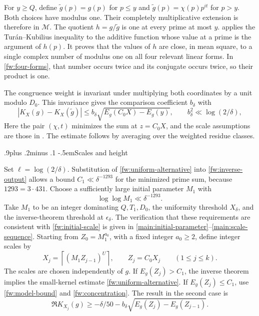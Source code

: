 \documentclass[twoside]{aomart}
\makeatletter
\theoremstyle{paperplain}
\theoremstyle{paperdefinition}
\renewcommand\subsection{\@startsection{subsection}{2}{\z@}
  {.9\baselineskip plus .2\baselineskip minus .1\baselineskip}
  {-.5em}{\normalfont\bfseries}}
\numberwithin{equation}{section}
\makeatother
\begin{document}
For $y\ge Q$, define $\widetilde g(p)=g(p)$ for $p\le y$ and
$\widetilde g(p)=\chi(p)p^{it}$ for $p>y$. Both choices have modulus
one. Their completely multiplicative extension is therefore in
$\mathcal M$. The quotient $h=g/\widetilde g$ is one at every
prime at most $y$.
 applies the Tur\'an--Kubilius inequality to
the additive function whose value at a prime is the argument of
$h(p)$. It proves that the values of $h$ are close, in mean square,
to a single complex number of modulus one on all four relevant
linear forms. In \eqref{fw:four-forms}, that number occurs twice
and its conjugate occurs twice, so their product is one.

The congruence weight is invariant under multiplying both
coordinates by a unit modulo $D_0$. This invariance gives the
comparison coefficient $b_\delta$ with
\begin{equation}
 |K_X(g)-K_X(\widetilde g)|
 \le b_\delta\sqrt{E_g(C_0X)-E_g(y)},
 \qquad b_\delta^2\ll\log(2/\delta),
 \label{fw:concentration}
\end{equation}
Here the pair $(\chi,t)$ minimizes the sum at $z=C_0X$,
and the scale assumptions are those in .
The estimate follows by averaging over the weighted residue classes.

\subsection{Scales and height}

Set $\ell=\log(2/\delta)$. Substitution of
\eqref{fw:uniform-alternative} into \eqref{fw:inverse-output}
allows a bound $C_1\ll\delta^{-1293}$ for the minimized prime sum,
because $1293=3\cdot431$. Choose a sufficiently large initial
parameter $M_1$ with
\begin{equation}
 \log\log M_1\ll\delta^{-1293}.
\label{fw:initial-scale}
\end{equation}
Take $M_1$ to be an integer dominating $Q,T_1,D_0$, the uniformity
threshold $X_\delta$, and the inverse-theorem threshold at
$\epsilon_\delta$. The verification that these requirements are
consistent with \eqref{fw:initial-scale} is given in
\eqref{main:initial-parameter}--\eqref{main:scale-sequence}.
Starting from $Z_0=M_1^{a_0}$, with a fixed integer $a_0\ge2$,
define integer scales by
\begin{equation}
 X_j=\left\lceil(M_1Z_{j-1})^U\right\rceil,\qquad
 Z_j=C_0X_j\qquad(1\le j\le k).
 \label{fw:scales}
\end{equation}
The scales are chosen independently of $g$. If $E_g(Z_j)>C_1$,
the inverse theorem implies the small-kernel estimate
\eqref{fw:uniform-alternative}. If $E_g(Z_j)\le C_1$, use
\eqref{fw:model-bound} and \eqref{fw:concentration}. The result
in the second case is
\begin{equation*}
 \Re K_{X_j}(g)\ge-\delta/50
         -b_\delta\sqrt{E_g(Z_j)-E_g(Z_{j-1})}.
\end{equation*}
\end{document}
